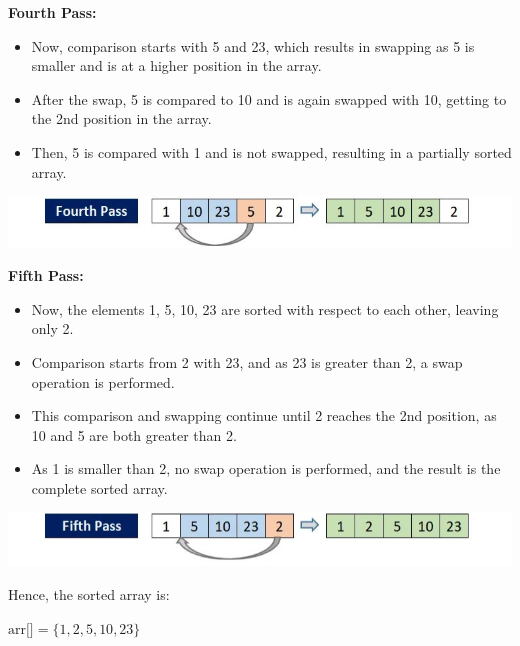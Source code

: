 \documentclass[a4paper,12pt,twocolumn]{article}
\begin{document}
\textbf{Fourth Pass:}
\begin{itemize}
    \item Now, comparison starts with 5 and 23, which results in swapping as 5 is smaller and is at a higher position in the array.
    \item After the swap, 5 is compared to 10 and is again swapped with 10, getting to the 2nd position in the array.
    \item Then, 5 is compared with 1 and is not swapped, resulting in a partially sorted array.
\end{itemize}
\begin{center}
    \includegraphics[width=\linewidth]{pass4.jpg}
    \label{fig:pass4}
\end{center}
\textbf{Fifth Pass:}
\begin{itemize}
    \item Now, the elements 1, 5, 10, 23 are sorted with respect to each other, leaving only 2.
    \item Comparison starts from 2 with 23, and as 23 is greater than 2, a swap operation is performed.
    \item This comparison and swapping continue until 2 reaches the 2nd position, as 10 and 5 are both greater than 2.
    \item As 1 is smaller than 2, no swap operation is performed, and the result is the complete sorted array.
\end{itemize}
\begin{center}
    \includegraphics[width=\linewidth]{pass5.jpg}
    \label{fig:pass5}
\end{center}
Hence, the sorted array is:
\begin{center}
    \(\text{arr[]} = \{1, 2, 5, 10, 23\}\)
\end{center}
\end{document}

